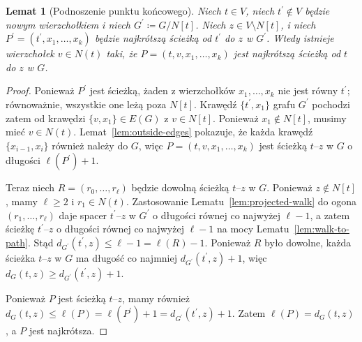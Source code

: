 \documentclass[11pt,a4paper]{amsart}
\theoremstyle{definition}
\theoremstyle{plain}
\newtheorem{lemma}[definition]{Lemat}
\newcommand{\len}[1]{\ell(#1)}
\newcommand{\dist}[3]{d_{#1}(#2,#3)}
\begin{document}
\begin{lemma}[Podnoszenie punktu końcowego]\label{lem:lifting-endpoint}
Niech $t\in V$, niech $t^\prime\notin V$ będzie nowym wierzchołkiem i niech $G^\prime\coloneqq G/N[t]$. Niech $z\in V\setminus N[t]$, i niech $P^\prime=(t^\prime,x_1,\dots,x_k)$ będzie najkrótszą ścieżką od $t^\prime$ do $z$ w $G^\prime$. Wtedy istnieje wierzchołek $v\in N(t)$ taki, że $P=(t,v,x_1,\dots,x_k)$ jest najkrótszą ścieżką od $t$ do $z$ w $G$.
\end{lemma}

\begin{proof}
Ponieważ $P^\prime$ jest ścieżką, żaden z wierzchołków $x_1,\dots,x_k$ nie jest równy $t^\prime$; równoważnie, wszystkie one leżą poza $N[t]$. Krawędź $\{t^\prime,x_1\}$ grafu $G^\prime$ pochodzi zatem od krawędzi $\{v,x_1\}\in E(G)$ z $v\in N[t]$. Ponieważ $x_1\notin N[t]$, musimy mieć $v\in N(t)$. Lemat~\ref{lem:outside-edges} pokazuje, że każda krawędź $\{x_{i-1},x_i\}$ również należy do $G$, więc $P=(t,v,x_1,\dots,x_k)$ jest ścieżką $t$--$z$ w $G$ o długości $\len{P^\prime}+1$.

Teraz niech $R=(r_0,\dots,r_\ell)$ będzie dowolną ścieżką $t$--$z$ w $G$. Ponieważ $z\notin N[t]$, mamy $\ell\ge 2$ i $r_1\in N(t)$. Zastosowanie Lematu~\ref{lem:projected-walk} do ogona $(r_1,\dots,r_\ell)$ daje spacer $t^\prime$--$z$ w $G^\prime$ o długości równej co najwyżej $\ell-1$, a zatem ścieżkę $t^\prime$--$z$ o długości równej co najwyżej $\ell-1$ na mocy Lematu~\ref{lem:walk-to-path}. Stąd $\dist{G^\prime}{t^\prime}{z}\le \ell-1=\len{R}-1$. Ponieważ $R$ było dowolne, każda ścieżka $t$--$z$ w $G$ ma długość co najmniej $\dist{G^\prime}{t^\prime}{z}+1$, więc $\dist{G}{t}{z}\ge \dist{G^\prime}{t^\prime}{z}+1$.

Ponieważ $P$ jest ścieżką $t$--$z$, mamy również $\dist{G}{t}{z}\le \len{P}=\len{P^\prime}+1=\dist{G^\prime}{t^\prime}{z}+1$. Zatem $\len{P}=\dist{G}{t}{z}$, a $P$ jest najkrótsza.
\end{proof}
\end{document}
